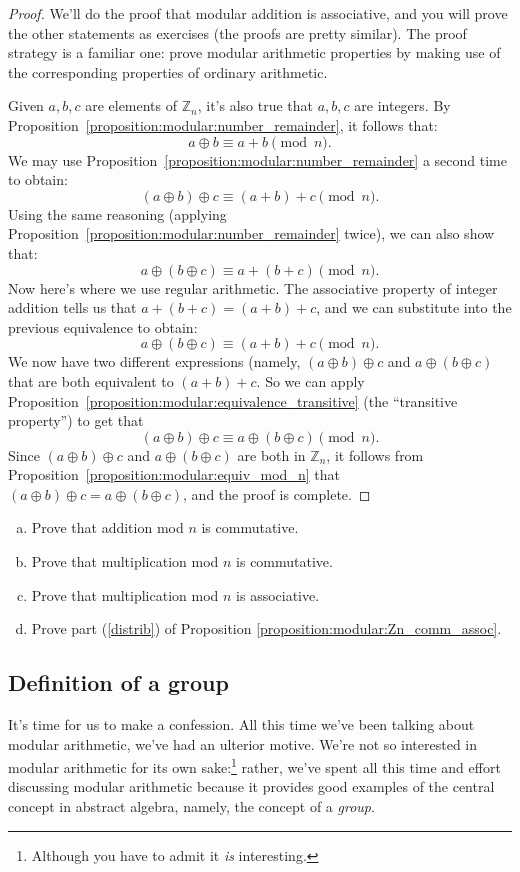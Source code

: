 \begin{proof}
We'll do the proof that modular addition is associative, and  you will prove the other statements as exercises (the proofs are pretty similar). The proof strategy is a familiar one: prove modular arithmetic properties by making use of the corresponding properties of ordinary arithmetic.


Given $a,b,c$ are elements of $\mathbb{Z}_n$, it's also true that $a,b,c$ are integers. By Proposition~\ref{proposition:modular:number_remainder}, it follows that:
\[ a \oplus b \equiv a + b \pmod{n}. \]
We may use Proposition~\ref{proposition:modular:number_remainder} a second time to obtain:
\[ (a \oplus b) \oplus c  \equiv (a + b) + c \pmod{n}. \]
Using the same reasoning (applying Proposition~\ref{proposition:modular:number_remainder} twice), we can also show that:
\[  a \oplus (b \oplus c)  \equiv a + (b + c) \pmod{n}.\]
Now here's where we use regular arithmetic. The associative property of integer addition tells us that $a + (b + c) = (a+b)+c$,
and we can substitute into the previous equivalence to obtain:
\[a \oplus (b \oplus c)  \equiv (a + b) + c \pmod{n}. \]
We now have two different expressions (namely, $(a \oplus b) \oplus c$ and $a \oplus (b \oplus c)$ that are both equivalent to $(a + b) + c$. So we can apply
Proposition~\ref{proposition:modular:equivalence_transitive} (the ``transitive property'') to get that
\[ (a \oplus b) \oplus c  \equiv  a \oplus (b \oplus c) \pmod{n}. \]
Since  $(a \oplus b) \oplus c$  and  $a \oplus (b \oplus c)$ are both in ${\mathbb{Z}}_n$, it follows from Proposition~\ref{proposition:modular:equiv_mod_n} that  
$(a \oplus b) \oplus c = a \oplus (b \oplus c)$, and the proof is complete. 
\end{proof}
 
\begin{exercise}{}
\begin{enumerate}[(a)]
\item
Prove that addition mod $n$ is commutative.
\item
Prove that multiplication mod $n$ is commutative.
\item
Prove that multiplication mod $n$ is associative.
\item
Prove  part (\ref{distrib}) of Proposition \ref{proposition:modular:Zn_comm_assoc}.
\end{enumerate}
\end{exercise} 

\subsection{Definition of a group}\label{DefOfGroup}
It's time for us to make a confession. All this time we've been talking about modular arithmetic, we've had an ulterior motive. We're not so interested in modular arithmetic for its own sake:\footnote{Although you have to admit it \emph{is} interesting.} rather, we've spent all this time and effort discussing modular arithmetic because it provides good examples of the central concept in abstract algebra, namely, the concept of a \emph{group}.


